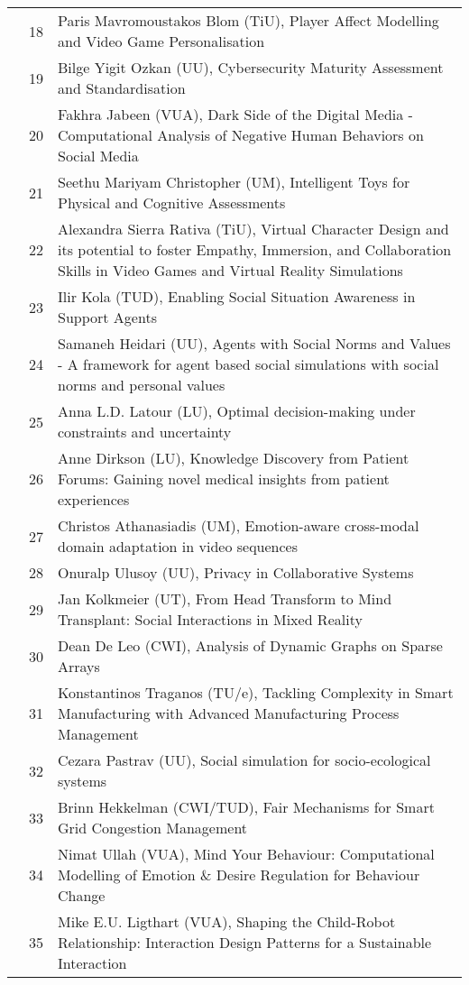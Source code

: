 {\begin{xltabular}{\linewidth}{@{} l @{\hspace{0.5em}} l @{\hspace{1em}} X @{}}
        &	 18	&	Paris Mavromoustakos Blom (TiU), Player Affect Modelling and Video Game Personalisation \\
        &	 19	&	Bilge Yigit Ozkan (UU), Cybersecurity Maturity Assessment and Standardisation \\
        &	 20	&	Fakhra Jabeen (VUA), Dark Side of the Digital Media - Computational Analysis of Negative Human Behaviors on Social Media \\
        &	 21	&	Seethu Mariyam Christopher (UM), Intelligent Toys for Physical and Cognitive Assessments \\
        &	 22	&	Alexandra Sierra Rativa (TiU), Virtual Character Design and its potential to foster Empathy, Immersion, and Collaboration Skills in Video Games and Virtual Reality Simulations \\
        &	 23	&	Ilir Kola (TUD), Enabling Social Situation Awareness in Support Agents \\
        &	 24	&	Samaneh Heidari (UU), Agents with Social Norms and Values - A framework for agent based social simulations with social norms and personal values \\
        &	 25	&	Anna L.D. Latour (LU), Optimal decision-making under constraints and uncertainty \\
        &	 26	&	Anne Dirkson (LU), Knowledge Discovery from Patient Forums: Gaining novel medical insights from patient experiences \\
        &	 27	&	Christos Athanasiadis (UM), Emotion-aware cross-modal domain adaptation in video sequences \\
        &	 28	&	Onuralp Ulusoy (UU), Privacy in Collaborative Systems \\
        &	 29	&	Jan Kolkmeier (UT), From Head Transform to Mind Transplant: Social Interactions in Mixed Reality \\
        &	 30	&	Dean De Leo (CWI), Analysis of Dynamic Graphs on Sparse Arrays \\
        &	 31	&	Konstantinos Traganos (TU/e), Tackling Complexity in Smart Manufacturing with Advanced Manufacturing Process Management \\
        &	 32	&	Cezara Pastrav (UU), Social simulation for socio-ecological systems \\
        &	 33	&	Brinn Hekkelman (CWI/TUD), Fair Mechanisms for Smart Grid Congestion Management \\
        &	 34	&	Nimat Ullah (VUA), Mind Your Behaviour: Computational Modelling of Emotion \& Desire Regulation for Behaviour Change \\
        &	 35	&	Mike E.U. Ligthart (VUA), Shaping the Child-Robot Relationship: Interaction Design Patterns for a Sustainable Interaction \\


\end{xltabular}}
